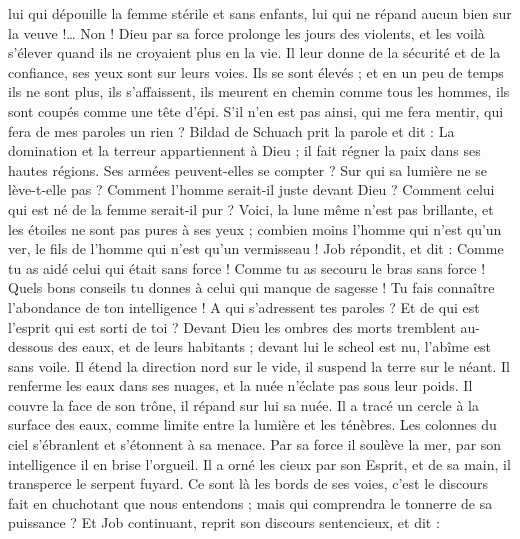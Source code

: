 \begin{multicols}{2}
lui qui dépouille la femme stérile et sans enfants, lui qui ne répand aucun bien sur la veuve !…
Non ! Dieu par sa force prolonge les jours des violents, et les voilà s'élever quand ils ne croyaient plus en la vie.
Il leur donne de la sécurité et de la confiance, ses yeux sont sur leurs voies.
Ils se sont élevés ; et en un peu de temps ils ne sont plus, ils s'affaissent, ils meurent en chemin comme tous les hommes, ils sont coupés comme une tête d'épi.
S'il n'en est pas ainsi, qui me fera mentir, qui fera de mes paroles un rien ?
\VerseOne{}Bildad de Schuach prit la parole et dit :
La domination et la terreur appartiennent à Dieu ; il fait régner la paix dans ses hautes régions.
Ses armées peuvent-elles se compter ? Sur qui sa lumière ne se lève-t-elle pas ?
Comment l'homme serait-il juste devant Dieu ? Comment celui qui est né de la femme serait-il pur ?
Voici, la lune même n'est pas brillante, et les étoiles ne sont pas pures à ses yeux ;
combien moins l'homme qui n'est qu'un ver, le fils de l'homme qui n'est qu'un vermisseau !
\VerseOne{}Job répondit, et dit :
Comme tu as aidé celui qui était sans force ! Comme tu as secouru le bras sans force !
Quels bons conseils tu donnes à celui qui manque de sagesse ! Tu fais connaître l'abondance de ton intelligence !
A qui s'adressent tes paroles ? Et de qui est l'esprit qui est sorti de toi ?
Devant Dieu les ombres des morts tremblent au-dessous des eaux, et de leurs habitants ;
devant lui le scheol est nu, l'abîme est sans voile.
Il étend la direction nord sur le vide, il suspend la terre sur le néant.
Il renferme les eaux dans ses nuages, et la nuée n'éclate pas sous leur poids.
Il couvre la face de son trône, il répand sur lui sa nuée.
Il a tracé un cercle à la surface des eaux, comme limite entre la lumière et les ténèbres.
Les colonnes du ciel s'ébranlent et s'étonnent à sa menace.
Par sa force il soulève la mer, par son intelligence il en brise l'orgueil.
Il a orné les cieux par son Esprit, et  de sa main, il transperce le serpent fuyard.
Ce sont là les bords de ses voies, c'est le discours fait en chuchotant que nous entendons ; mais qui comprendra le tonnerre de sa puissance ?
\VerseOne{}Et Job continuant, reprit son discours sentencieux, et dit :

\end{multicols}
